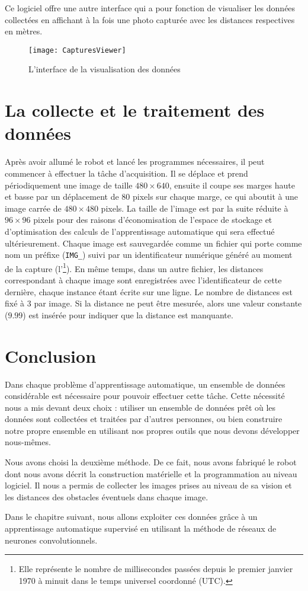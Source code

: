 Ce logiciel offre une autre interface qui a pour fonction de visualiser les
données collectées en affichant à la fois une photo capturée avec les distances
respectives en mètres.

\begin{figure}[H]
\begin{center}
\texttt{[image: CapturesViewer]}
\caption{L'interface de la visualisation des données}
\end{center}
\end{figure}

\section{La collecte et le traitement des données}

Après avoir allumé le robot et lancé les programmes nécessaires, il peut commencer
à effectuer la tâche d'acquisition. Il se déplace et prend périodiquement une image
de taille $480 \times 640$, ensuite il coupe ses marges haute et basse par un
déplacement de $80$ pixels sur chaque marge, ce qui aboutit à une image carrée
de $480 \times 480$ pixels. La taille de l'image est par la suite réduite à
$96 \times 96$ pixels pour des raisons d'économisation de l'espace de stockage
et d'optimisation des calculs de l'apprentissage automatique qui sera effectué
ultérieurement. Chaque image est sauvegardée comme un fichier qui porte comme
nom un préfixe (\texttt{IMG\_}) suivi par un identificateur numérique généré
au moment de la capture (l'\footnote{Elle représente le nombre de
millisecondes passées depuis le premier janvier 1970 à minuit dans le temps
universel coordonné (UTC).}). En même temps, dans un autre fichier, les distances
correspondant à chaque image sont enregistrées avec l'identificateur de cette
dernière, chaque instance étant écrite sur une ligne. Le nombre de distances
est fixé à $3$ par image. Si la distance ne peut être mesurée, alors une valeur
constante ($9.99$) est insérée pour indiquer que la distance est manquante.

\section{Conclusion}

Dans chaque problème d'apprentissage automatique, un ensemble de données considérable
est nécessaire pour pouvoir effectuer cette tâche. Cette nécessité nous a mis devant
deux choix : utiliser un ensemble de données prêt où les données sont collectées
et traitées par d'autres personnes, ou bien construire notre propre ensemble en
utilisant nos propres outils que nous devons développer nous-mêmes.

Nous avons choisi la deuxième méthode. De ce fait, nous avons
fabriqué le robot dont nous avons décrit la construction matérielle et la
programmation au niveau logiciel. Il nous a permis de collecter les images
prises au niveau de sa vision et les distances des obstacles éventuels dans
chaque image.

Dans le chapitre suivant, nous allons exploiter ces données grâce à
un apprentissage automatique supervisé en utilisant la méthode de
réseaux de neurones convolutionnels.
